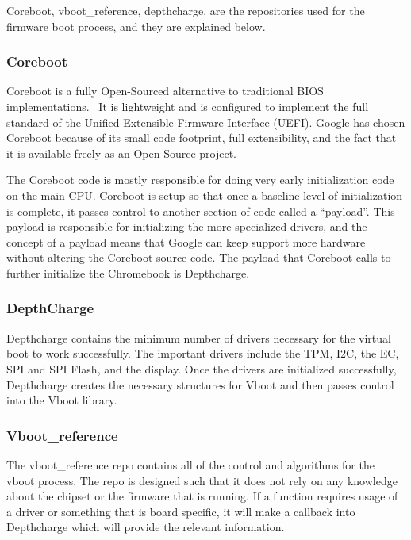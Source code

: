 \documentclass[../report.tex]{subfiles}
\begin{document}
Coreboot, vboot\_reference, depthcharge, are the repositories used for the firmware boot process, and they are explained below. 

\subsubsection{Coreboot}

Coreboot is a fully Open-Sourced alternative to traditional BIOS implementations.~\cite{coreboot}
It is lightweight and is configured to implement the full standard of the Unified Extensible Firmware Interface (UEFI).
Google has chosen Coreboot because of its small code footprint, full extensibility, and the fact that it is available freely as an Open Source project.

The Coreboot code is mostly responsible for doing very early initialization code on the main CPU\@. 
Coreboot is setup so that once a baseline level of initialization is complete, it passes control to another section of code called a ``payload''.
This payload is responsible for initializing the more specialized drivers, and the concept of a payload means that Google can keep support more hardware without altering the Coreboot source code.
The payload that Coreboot calls to further initialize the Chromebook is Depthcharge.


\subsubsection{DepthCharge}

Depthcharge contains the minimum number of drivers necessary for the virtual boot to work successfully. 
The important drivers include the TPM, I2C, the EC, SPI and SPI Flash, and the display.
Once the drivers are initialized successfully, Depthcharge creates the necessary structures for Vboot and then passes control into the Vboot library.

\subsubsection{Vboot\_reference}

The vboot\_reference repo contains all of the control and algorithms for the vboot process.
The repo is designed such that it does not rely on any knowledge about the chipset or the firmware that is running. 
If a function requires usage of a driver or something that is board specific, it will make a callback into Depthcharge which will provide the relevant information.
\end{document}
